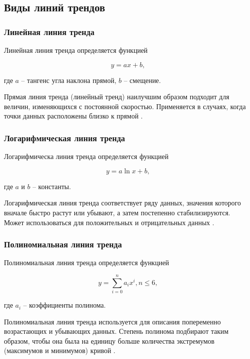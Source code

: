\documentclass{bmstu}
\begin{document}
\subsection{Виды линий трендов}

\subsubsection*{Линейная линия тренда}

Линейная линия тренда определяется функцией

\begin{equation}
	y = ax + b,
\end{equation}

где $a$ -- тангенс угла наклона прямой, $b$ -- смещение.

Прямая линия тренда (линейный тренд) наилучшим образом подходит для величин, изменяющихся с постоянной скоростью. Приме­няется в случаях, когда точки данных расположены близко к прямой \cite{lt_exel}.

\subsubsection*{Логарифмическая линия тренда}

Логарифмическа линия тренда определяется функцией

\begin{equation}
	y = a\ln x + b,
\end{equation}

где $a$ и $b$ -- константы.

Логарифмическая линия тренда соответствует ряду данных, значения которого вначале быстро растут или убывают, а затем постепенно стабилизируются. Может использоваться для положительных и отрицательных данных \cite{lt_exel}.

\subsubsection*{Полиномиальная линия тренда}

Полиномиальная линия тренда определяется функцией

\begin{equation}
	y = \sum_{i = 0}^{n} a_i x^i, n \leqslant 6,
\end{equation}

где $a_i$ -- коэффициенты полинома.

Полиномиальная линия тренда используется для описания попеременно возрастающих и убывающих данных. Степень полинома подбирают таким образом, чтобы она была на единицу больше количества экстремумов (максимумов и минимумов) кривой \cite{lt_exel}.
\end{document}
